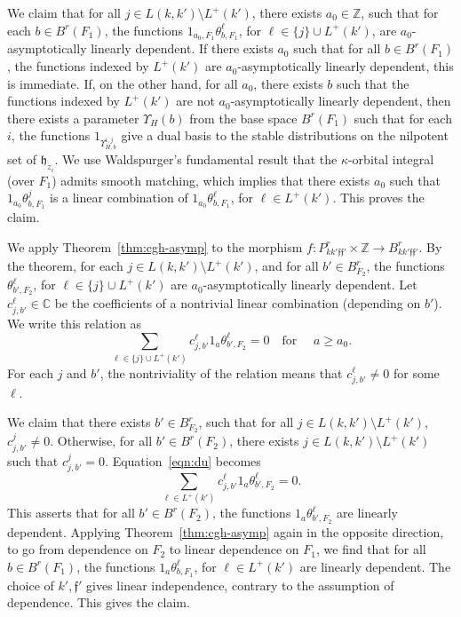 \documentclass[12pt]{amsart}
\newcommand{\ring}[1]{{\mathbb #1}}
\def\Y{\Upsilon}
\def\s{{\mathfrak{f}}}
\newcommand{\fh}{\mathfrak{h}}
\theoremstyle{plain}
\theoremstyle{definition}
\begin{document}
We claim that for all $j \in L(k,k')\setminus L^+(k')$, there exists
$a_0\in\ring{Z}$, such that for each $b\in B^r(F_1)$, the functions
$1_{a_0,F_1}\theta^\ell_{b,F_1}$, for $\ell\in \{j\}\cup L^+(k')$, are
$a_0$-asymptotically linearly dependent.  If there exists $a_0$ such
that for all $b\in B^r(F_1)$, the functions indexed by $L^+(k')$ are
$a_0$-asymptotically linearly dependent, this is immediate.  If, on
the other hand, for all $a_0$, there exists $b$ such that the
functions indexed by $L^+(k')$ are not $a_0$-asymptotically linearly
dependent, then there exists a parameter $\Y_H(b)$ from the base space
$B^r(F_1)$ such that for each $i$, the functions
$1_{\Y_{H,b}^{i,j}}$ give a dual basis to the stable distributions
on the nilpotent set of $\fh_{z_i}$.  We use Waldspurger's
fundamental result \cite{waldspurger1997lemme} that the $\kappa$-orbital integral (over
$F_1$) admits smooth matching, which implies that there exists $a_0$
such that $1_{a_0}\theta^{j}_{b,F_1}$ is a linear combination of
$1_{a_0}\theta^\ell_{b,F_1}$, for $\ell\in L^+(k')$.  This proves the claim.


We apply Theorem~\ref{thm:cgh-asymp} to the morphism $f:P^r_{kk'\s \s'}\times\ring{Z}\to
B^r_{kk'\s \s'}$.  By the theorem, for each $j\in L(k,k')\setminus L^+(k')$, and for
all $b'\in B^r_{F_2}$, the functions $\theta^\ell_{b',F_2}$, for $\ell\in
\{j\}\cup L^+(k')$ are $a_0$-asymptotically linearly dependent.  Let $c^\ell_{j,b'}\in \ring{C}$
be the coefficients of a nontrivial linear combination (depending on
$b'$).  We write this relation as
\begin{equation}\label{eqn:du}
\sum_{\ell\in \{j\}\cup L^+(k')} c^\ell_{j,b'}1_a\theta^\ell_{b',F_2}  =
0\quad\text{for }\quad a\ge a_0.
\end{equation}
For each $j$ and $b'$, the nontriviality of the relation
means
that $c^\ell_{j,b'}\ne 0$ for some $\ell$.

We claim that there exists $b'\in B^r_{F_2}$, such that for all $j\in
L(k,k')\setminus L^+(k')$,
$c^j_{j,b'}\ne 0$.  Otherwise, for all $b'\in B^r(F_2)$, there exists
$j\in L(k,k')\setminus L^+(k')$ such that $c^j_{j,b'}=0$.  Equation~\ref{eqn:du}
becomes
\begin{equation}\label{eqn:du}
\sum_{\ell\in L^+(k')} c^\ell_{j,b'}1_a\theta^\ell_{b',F_2}  = 0.
\end{equation}
This asserts that for all $b'\in B^r(F_2)$, the functions
$1_a\theta^\ell_{b',F_2}$ are linearly dependent.  Applying
Theorem~\ref{thm:cgh-asymp} again in the opposite direction, to go from
dependence on $F_2$ to linear dependence on $F_1$, we find that for all
$b\in B^r(F_1)$, the functions $1_a\theta^\ell_{b,F_1}$, for $\ell\in L^+(k')$ are linearly
dependent.  The choice of $k',\s'$ gives linear independence, contrary to
the assumption of dependence.  This gives the claim.
\end{document}
